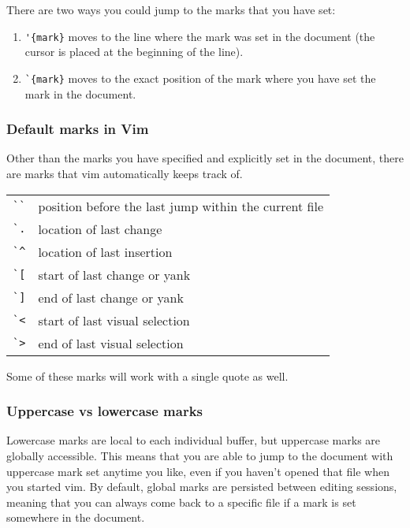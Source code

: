 There are two ways you could jump to the marks that you have set:
\begin{enumerate}
    \item \verb|'{mark}| moves to the line where the mark was set in the document (the cursor is placed at the beginning of the line).
    \item \verb|`{mark}| moves to the exact position of the mark where you have set the mark in the document.
\end{enumerate}

\subsubsection{Default marks in Vim}

Other than the marks you have specified and explicitly set in the document, there are marks that vim automatically keeps track of.
\newline

\begin{tabular}{c|l}
    \verb|``| & position before the last jump within the current file\\
    \verb|`.| & location of last change\\
    \verb|`^| & location of last insertion\\
    \verb|`[| & start of last change or yank\\
    \verb|`]| & end of last change or yank\\
    \verb|`<| & start of last visual selection\\
    \verb|`>| & end of last visual selection\\
\end{tabular}
\newline

Some of these marks will work with a single quote as well.

\subsubsection{Uppercase vs lowercase marks}

Lowercase marks are local to each individual buffer, but uppercase marks are globally accessible.
This means that you are able to jump to the document with uppercase mark set anytime you like, even if you haven't opened that file when you started vim.
By default, global marks are persisted between editing sessions, meaning that you can always come back to a specific file if a mark is set somewhere in the document.

